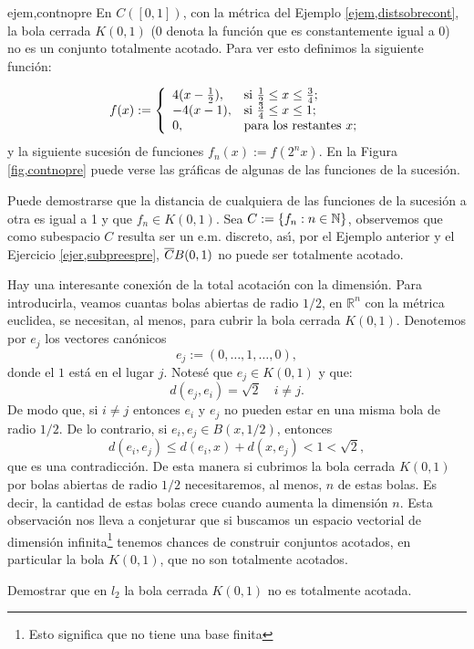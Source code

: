 \begin{ejemplo}{ejem,contnopre} En $C([0,1])$, con la métrica
 del Ejemplo
\vref{ejem,distsobrecont}, la bola cerrada $K(0,1)$ (0 denota la
función que es constantemente igual a 0) no es un conjunto
totalmente acotado. Para ver esto definimos la siguiente
función:

\[
	f(x):=\left\{%
\begin{array}{ll}
	4(x-\frac12), & \hbox{si $\frac12\leq x\leq \frac34$;} \\
	-4(x-1), & \hbox{si $\frac34\leq x\leq 1$;} \\
	0, & \hbox{para los restantes $x$;} \\
\end{array}
\right.
\]
y la siguiente sucesión de funciones $f_n(x):=f(2^nx)$. En la
Figura \ref{fig,contnopre} puede verse las gráficas de algunas
de las funciones de la sucesión.


Puede demostrarse que la distancia de cualquiera de las funciones
de la sucesión a otra es igual a 1 y que $f_n\in K(0,1)$. Sea
$C:=\{f_n:n\in\mathbb{N}\}$, observemos que como subespacio $C$ resulta
ser un e.m. discreto, as\'{\i}, por el Ejemplo anterior y el
Ejercicio \vref{ejer,subpreespre}, $\overline{C}{B(0,1)}$ no puede ser
totalmente acotado.
\end{ejemplo}

\begin{ejemplo}{} Hay una interesante conexión de la total
acotación con la dimensión. Para introducirla, veamos
 cuantas bolas abiertas de radio
$1/2$, en $\mathbb{R}^n$ con la métrica euclidea,
se necesitan, al menos,  para cubrir la bola cerrada $K(0,1)$.
Denotemos por $e_j$ los vectores canónicos
\[
	e_j:=(0,\ldots,1,\ldots,0),
\]
donde el $1$ está en el lugar $j$. Notesé que $e_j\in K(0,1)$ y que:
\[
	d(e_j,e_i)=\sqrt{2}\quad i\neq j.
\]
De modo que, si $i\neq j$ entonces $e_i$ y $e_j$ no pueden estar
en una misma bola de radio $1/2$. De lo contrario, si $e_i,e_j\in
B(x,1/2)$, entonces
\[
	d(e_i,e_j)\leq d(e_i,x)+d(x,e_j)<1<\sqrt{2},
\]
que es una contradicción. De esta manera si cubrimos la bola cerrada
$K(0,1)$ por bolas abiertas de radio $1/2$ necesitaremos, al menos,
$n$ de estas bolas. Es decir, la cantidad de estas bolas crece cuando aumenta
la dimensión $n$. Esta observación nos lleva a conjeturar que si
buscamos un espacio vectorial de dimensión infinita\footnote{Esto significa
que no tiene una base finita} tenemos chances de construir conjuntos acotados,
en particular la bola $K(0,1)$, que no son totalmente acotados.

\begin{ejercicio}{} Demostrar que en $l_2$ la bola cerrada $K(0,1)$
no es totalmente acotada.
\end{ejercicio}
\end{ejemplo}


